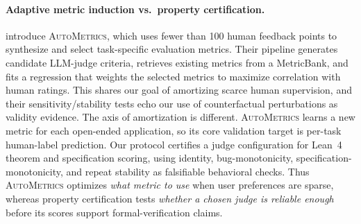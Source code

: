 \paragraph{Adaptive metric induction vs.\ property certification.}
\citet{ryan2025autometrics} introduce \textsc{AutoMetrics}, which uses fewer than 100 human feedback points to synthesize and select task-specific evaluation metrics.
Their pipeline generates candidate LLM-judge criteria, retrieves existing metrics from a MetricBank, and fits a regression that weights the selected metrics to maximize correlation with human ratings.
This shares our goal of amortizing scarce human supervision, and their sensitivity/stability tests echo our use of counterfactual perturbations as validity evidence.
The axis of amortization is different.
\textsc{AutoMetrics} learns a new metric for each open-ended application, so its core validation target is per-task human-label prediction.
Our protocol certifies a judge configuration for Lean~4 theorem and specification scoring, using identity, bug-monotonicity, specification-monotonicity, and repeat stability as falsifiable behavioral checks.
Thus \textsc{AutoMetrics} optimizes \emph{what metric to use} when user preferences are sparse, whereas property certification tests \emph{whether a chosen judge is reliable enough} before its scores support formal-verification claims.
